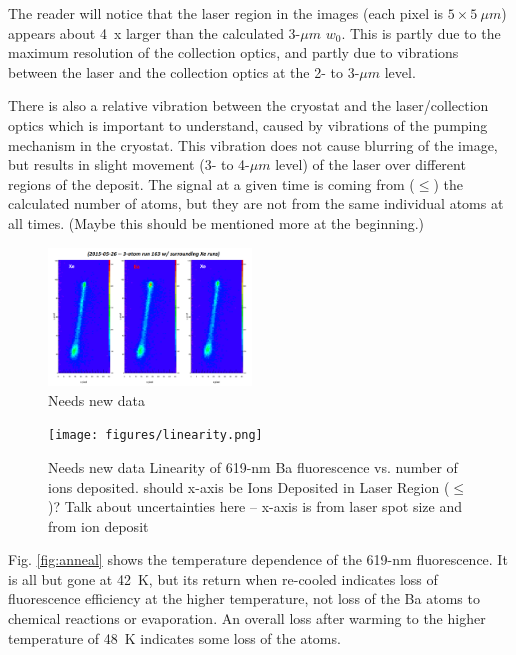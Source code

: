 \documentclass[aps,pra,reprint,superscriptaddress]{revtex4-1}
\begin{document}
The reader will notice that the laser region in the images (each pixel is $5\times5~\mu m$) appears about 4~x larger than the calculated {\color{red}3-$\mu m$} $w_{0}$.  This is partly due to the maximum resolution of the collection optics, and partly due to vibrations between the laser and the collection optics at the 2- to 3-$\mu m$ level.

There is also a relative vibration between the cryostat and the laser/collection optics which is important to understand, caused by vibrations of the pumping mechanism in the cryostat.  This vibration does not cause blurring of the image, but results in slight movement (3- to 4-$\mu m$ level) of the laser over different regions of the deposit.  The signal at a given time is coming from ($\leq$) the calculated number of atoms, but they are not from the same individual atoms at all times.  {\color{red}(Maybe this should be mentioned more at the beginning.)}

\begin{figure}
\includegraphics[width=0.48\textwidth]{figures/image_raw_3-atom_with_pre-post-.png}
\caption{{\color{red}Needs new data}}
\label{fig:raw}
\end{figure}

\begin{figure}
\texttt{[image: figures/linearity.png]}
\caption{{\color{red}Needs new data}  Linearity of 619-nm Ba fluorescence vs. number of ions deposited.  {\color{red}should x-axis be Ions Deposited in Laser Region ($\leq$)?  Talk about uncertainties here -- x-axis is from laser spot size and from ion deposit}}
\label{fig:linearity}
\end{figure}

Fig. \ref{fig:anneal} shows the temperature dependence of the 619-nm fluorescence.  It is all but gone at 42~K, but its return when re-cooled indicates loss of fluorescence efficiency at the higher temperature, not loss of the Ba atoms to chemical reactions or evaporation.  An overall loss after warming to the higher temperature of 48~K indicates some loss of the atoms.
\end{document}
